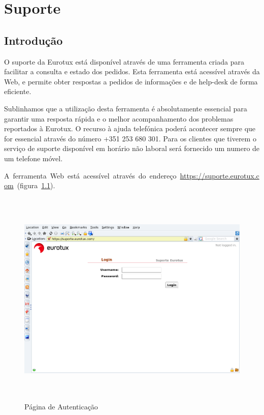 \chapter{Suporte}

\section{Introdução}
O suporte da Eurotux está disponível através de uma ferramenta criada para facilitar a consulta e estado dos pedidos. Esta ferramenta está acessível através da Web, e permite obter respostas a pedidos de informações e de help-desk de forma eficiente.

Sublinhamos que a utilização desta ferramenta é absolutamente essencial para garantir uma resposta rápida e o melhor acompanhamento dos problemas reportados à Eurotux. O recurso à ajuda telefónica poderá acontecer sempre que for essencial através do número +351 253 680 301. Para os clientes que tiverem o serviço de suporte disponível em horário não laboral será fornecido um numero de um telefone móvel.

\mbox{A ferramenta Web está acessível através do endereço \url{https://suporte.eurotux.com} (figura \ref{fig:rt1}).}

\begin{figure}[H]
\begin{center}
\includegraphics[width=16cm,height=10.5cm]{include/img/rt1}
\end{center}
\caption{Página de Autenticação}
\label{fig:rt1}
\end{figure}

